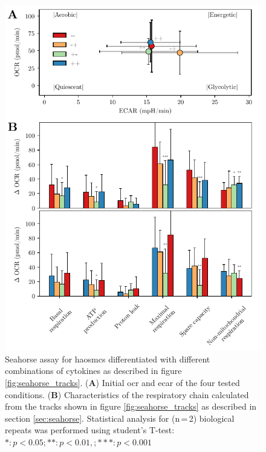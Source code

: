     \begin{figure}[h!]
    \capstart
        \centering
    	\includegraphics{Abbildung/Seahorse_summary_merged.pdf}

    	\begin{minipage}{\captionwidth}
    		\caption[energy_profile]{ \newline Seahorse assay for \acp{haosmc} differentiated with different combinations of cytokines as described in figure \ref{fig:seahorse_tracks}.
            (\textbf{A}) Initial \ac{ocr} and \ac{ecar} of the four tested conditions. (\textbf{B}) Characteristics of the respiratory chain calculated from the tracks shown in figure \ref{fig:seahorse_tracks} as described in section \ref{sec:seahorse}. Statistical analysis for (n\,=\,2) biological repeats was performed using student's T-test: $*: p < 0.05; **: p < 0.01, ; ***: p < 0.001$}
    		\label{fig:energy_profile}
    	\end{minipage}
    \end{figure}

